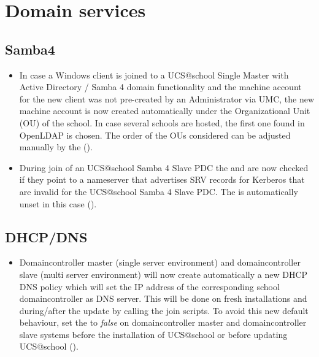 
\section{Domain services}

\subsection{Samba4}
\begin{itemize}
\item In case a Windows client is joined to a UCS@school Single Master with Active Directory / Samba 4 domain functionality and the machine account for the new client was not pre-created by an Administrator via UMC, the new machine account is now created automatically under the Organizational Unit (OU) of the school. In case several schools are hosted, the first one found in OpenLDAP is chosen. The order of the OUs considered can be adjusted manually by the  ().
\item During join of an UCS@school Samba 4 Slave PDC the  and  are now checked if they point to a nameserver that advertises SRV records for Kerberos that are invalid for the UCS@school Samba 4 Slave PDC. The \ucsUCRV{} is automatically unset in this case ().
\end{itemize}

\subsection{DHCP/DNS}
\begin{itemize}
\item Domaincontroller master (single server environment) and domaincontroller slave (multi server
  environment) will now create automatically a new DHCP DNS policy which will set the IP address of the
  corresponding school domaincontroller as DNS server. This will be done on fresh installations and
  during/after the update by calling the join scripts. To avoid this new default behaviour, set the
   to \emph{false} on domaincontroller master
  and domaincontroller slave systems before the installation of UCS@school or before updating UCS@school
  ().
\end{itemize}


